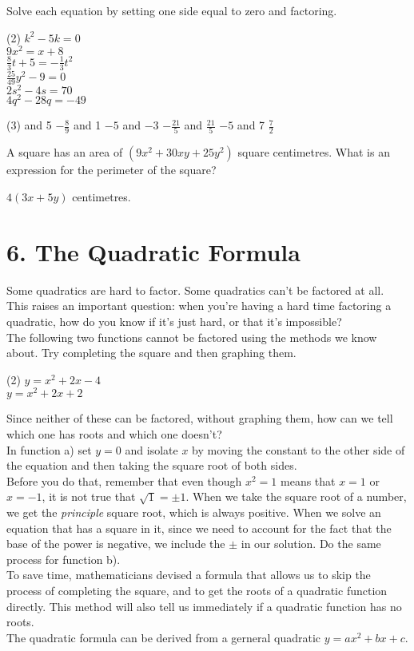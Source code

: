 \documentclass[12pt,fleqn]{book}
\newcommand{\prb}[1]{\begin{Exercise}#1\end{Exercise}}
\newcommand{\sol}[1]{\begin{Answer}#1\end{Answer}}
\begin{document}
\prb{Solve each equation by setting one side equal to zero and factoring.
	\begin{tasks}(2)
		\task $k^2-5 k=0$
		\\[5em]
		\task $9 x^2=x+8$
		\\[5em]
		\task $\frac{8}{3} t+5=-\frac{1}{3} t^2$
		\\[5em]
		\task $\frac{25}{49} y^2-9=0$
		\\[5em]
		\task $2 s^2-4 s=70$
		\\[5em]
		\task $4 q^2-28 q=-49$
		\\[5em]
	\end{tasks}
}
\sol{
	\begin{tasks}(3)
		 and 5
		\task $-\frac{8}{9}$ and 1
		\task $-5$ and $-3$
		\task $-\frac{21}{5}$ and $\frac{21}{5}$
		\task $-5$ and 7
		\task $\frac{7}{2}$
	\end{tasks}
}
\prb{A square has an area of $\left(9 x^2+30 x y+25 y^2\right)$ square centimetres. What is an expression for the perimeter of the square?\\[5em]}
\sol{$4(3x + 5y)$ centimetres.}

\chapter{6. The Quadratic Formula}
Some quadratics are hard to factor.  Some quadratics can't be factored at all.  This raises an important question: when you're having a hard time factoring a quadratic, how do you know if it's just hard, or that it's impossible? 
\\[1em]
The following two functions cannot be factored using the methods we know about.  Try completing the square and then graphing them.
\begin{tasks}(2)
	\task $y=x^{2}+2x-4$\\[4em]
	\task $y=x^{2}+2x+2$\\[4em]
\end{tasks}
Since neither of these can be factored, without graphing them, how can we tell which one has roots and which one doesn't?
\\[1em]
In function a) set $y=0$ and isolate $x$ by moving the constant to the other side of the equation and then taking the square root of both sides.
\\[1em]
Before you do that, remember that even though $x^2=1$ means that $x=1$ or $x=-1$, it is not true that $\sqrt 1 = \pm 1$.  When we take the square root of a number, we get the \emph{principle} square root, which is always positive.  When we solve an equation that has a square in it, since we need to account for the fact that the base of the power is negative, we include the $\pm$ in our solution.
\clearpage
Do the same process for function b).
\\[3in]
To save time, mathematicians devised a formula that allows us to skip the process of completing the square, and to get the roots of a quadratic function directly.  This method will also tell us immediately if a quadratic function has no roots.
\\[1em]
The quadratic formula can be derived from a gerneral quadratic $y=ax^2+bx+c$.
\clearpage
\end{document}
